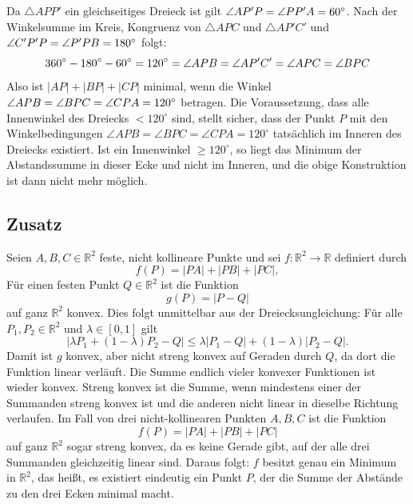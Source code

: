 \documentclass[12pt,a4paper]{article}
\begin{document}
Da $\triangle APP'$ ein gleichseitiges Dreieck ist gilt $\angle AP'P = \angle PP'A = 60 \degree$. Nach der Winkelsumme im Kreis, Kongruenz von $\triangle APC$ und $\triangle AP'C'$ und $\angle C'P'P = \angle P'PB = 180 \degree$ folgt: 
\[
    360\degree - 180\degree - 60\degree = 120 \degree = \angle APB = \angle AP'C' = \angle APC = \angle BPC
\]
\newpage
\noindent Also ist $|AP| + |BP| + |CP|$ minimal, wenn die Winkel $\angle APB = \angle BPC = \angle CPA = 120\degree$ betragen. Die Voraussetzung, dass alle Innenwinkel des Dreiecks $< 120^\circ$ sind, stellt sicher, dass der Punkt $P$ mit den Winkelbedingungen $\angle APB = \angle BPC = \angle CPA = 120^\circ$ tatsächlich im Inneren des Dreiecks existiert. Ist ein Innenwinkel $\geq 120^\circ$, so liegt das Minimum der Abstandssumme in dieser Ecke und nicht im Inneren, und die obige Konstruktion ist dann nicht mehr möglich.

\subsection*{Zusatz}
Seien \(A, B, C \in \mathbb{R}^2\) feste, nicht kollineare Punkte und sei \(f: \mathbb{R}^2 \to \mathbb{R}\) definiert durch 
\[     
    f(P) = |PA| + |PB| + |PC|, 
\] 
Für einen festen Punkt \(Q \in \mathbb{R}^2\) ist die Funktion 
\[     
    g(P) = |P - Q| 
\] 
auf ganz \(\mathbb{R}^2\) konvex. Dies folgt unmittelbar aus der Dreiecksungleichung: Für alle \(P_1, P_2 \in \mathbb{R}^2\) und \(\lambda \in [0,1]\) gilt 
\[     
    | \lambda P_1 + (1-\lambda) P_2 - Q | \leq \lambda |P_1 - Q| + (1-\lambda) |P_2 - Q|. 
\] 
Damit ist \(g\) konvex, aber nicht streng konvex auf Geraden durch \(Q\), da dort die Funktion linear verläuft. Die Summe endlich vieler konvexer Funktionen ist wieder konvex. Streng konvex ist die Summe, wenn mindestens einer der Summanden streng konvex ist und die anderen nicht linear in dieselbe Richtung verlaufen. Im Fall von drei nicht-kollinearen Punkten \(A, B, C\) ist die Funktion 
\[     
    f(P) = |PA| + |PB| + |PC| 
\] 
auf ganz \(\mathbb{R}^2\) sogar streng konvex, da es keine Gerade gibt, auf der alle drei Summanden gleichzeitig linear sind. 
Daraus folgt: \(f\) besitzt genau ein Minimum in \(\mathbb{R}^2\), das heißt, es existiert eindeutig ein Punkt \(P\), der die Summe der Abstände zu den drei Ecken minimal macht.
\end{document}
